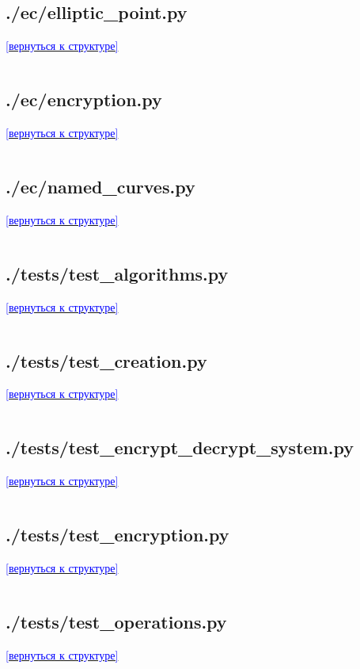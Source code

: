 \label{sec:ec_elliptic_point}
\subsection*{./ec/elliptic\_point.py}
\noindent\hyperref[sec:appendix]{\textcolor{blue}{[вернуться к структуре]}}
\inputminted{python}{../ec/elliptic_point.py}

\label{sec:ec_encryption}
\subsection*{./ec/encryption.py}
\noindent\hyperref[sec:appendix]{\textcolor{blue}{[вернуться к структуре]}}
\inputminted{python}{../ec/encryption.py}

\label{sec:ec_named_curves}
\subsection*{./ec/named\_curves.py}
\noindent\hyperref[sec:appendix]{\textcolor{blue}{[вернуться к структуре]}}
\inputminted{python}{../ec/named_curves.py}

\label{sec:tests_algorithms}
\subsection*{./tests/test\_algorithms.py}
\noindent\hyperref[sec:appendix]{\textcolor{blue}{[вернуться к структуре]}}
\inputminted{python}{../tests/test_algorithms.py}

\label{sec:tests_creation}
\subsection*{./tests/test\_creation.py}
\noindent\hyperref[sec:appendix]{\textcolor{blue}{[вернуться к структуре]}}
\inputminted{python}{../tests/test_creation.py}

\label{sec:tests_encrypt_decrypt_system}
\subsection*{./tests/test\_encrypt\_decrypt\_system.py}
\noindent\hyperref[sec:appendix]{\textcolor{blue}{[вернуться к структуре]}}
\inputminted{python}{../tests/test_encrypt_decrypt_system.py}

\label{sec:tests_encryption}
\subsection*{./tests/test\_encryption.py}
\noindent\hyperref[sec:appendix]{\textcolor{blue}{[вернуться к структуре]}}
\inputminted{python}{../tests/test_encryption.py}

\label{sec:tests_operations}
\subsection*{./tests/test\_operations.py}
\noindent\hyperref[sec:appendix]{\textcolor{blue}{[вернуться к структуре]}}
\inputminted{python}{../tests/test_operations.py}